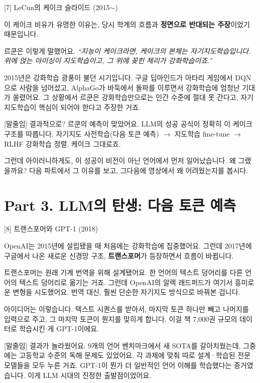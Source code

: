 \documentclass[aspectratio=169,10pt]{beamer}
\newenvironment{script}{%
  \footnotesize
  \setlength{\parskip}{0.5em}
  \setlength{\parindent}{0pt}
}{}
\begin{document}
\begin{frame}{[7] LeCun의 케이크 슬라이드 (2015$\sim$)}
\begin{script}
이 케이크 비유가 유명한 이유는, 당시 학계의 흐름과 \textbf{정면으로 반대되는 주장}이었기 때문입니다.

르쿤은 이렇게 말했어요. \textit{``지능이 케이크라면, 케이크의 본체는 자기지도학습입니다. 위에 얹는 아이싱이 지도학습이고, 그 위에 꽂힌 체리가 강화학습이죠.''}

2015년은 강화학습 광풍이 불던 시기입니다. 구글 딥마인드가 아타리 게임에서 DQN으로 사람을 넘어섰고, AlphaGo가 바둑에서 돌파를 이루면서 강화학습에 엄청난 기대가 쏠렸어요. 그 상황에서 르쿤은 강화학습만으로는 인간 수준에 절대 못 간다고, 자기지도학습이 핵심이 되어야 한다고 주장한 거죠.

[말줄임] 결과적으로? 르쿤의 예측이 맞았어요. LLM의 성공 공식이 정확히 이 케이크 구조를 따릅니다. 자기지도 사전학습(다음 토큰 예측) $\to$ 지도학습 fine-tune $\to$ RLHF 강화학습 정렬. 케이크 그대로죠.

그런데 아이러니하게도, 이 성공이 \alert{비전이 아닌 언어에서 먼저 일어났습니다}. 왜 그랬을까요? 다음 파트에서 그 이유를 보고, 그다음에 영상에서 왜 어려웠는지를 봅시다.
\end{script}
\end{frame}

\section{Part 3. LLM의 탄생: 다음 토큰 예측}

\begin{frame}{[8] 트랜스포머와 GPT-1 (2018)}
\begin{script}
OpenAI는 2015년에 설립됐을 때 처음에는 강화학습에 집중했어요. 그런데 2017년에 구글에서 나온 새로운 신경망 구조, \textbf{트랜스포머}가 등장하면서 흐름이 바뀝니다.

트랜스포머는 원래 기계 번역을 위해 설계됐어요. 한 언어의 텍스트 덩어리를 다른 언어의 텍스트 덩어리로 옮기는 거죠. 그런데 OpenAI의 알렉 래드퍼드가 여기서 흥미로운 변형을 시도했어요. 번역 대신, 훨씬 단순한 자기지도 방식으로 바꿔본 겁니다.

아이디어는 이렇습니다. 텍스트 시퀀스를 받아서, 마지막 토큰 하나만 빼고 나머지를 입력으로 주고, 그 마지막 토큰이 뭔지를 맞히게 합니다. 이걸 책 7,000권 규모의 데이터로 학습시킨 게 GPT-1이에요.

[말줄임] 결과가 놀라웠어요. 9개의 언어 벤치마크에서 새 SOTA를 갈아치웠는데, 그중에는 고등학교 수준의 독해 문제도 있었어요. 각 과제에 맞춰 따로 설계·학습된 전문 모델들을 모두 누른 거죠. GPT-1이 뭔가 더 일반적인 언어 이해를 학습했다는 증거였습니다. 이게 LLM 시대의 진정한 출발점이었어요.
\end{script}
\end{frame}
\end{document}

